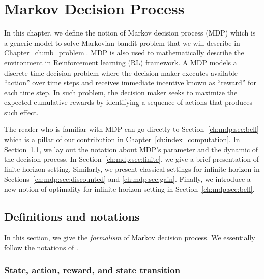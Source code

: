 \begingroup

\let\clearpage\relax

\chapter{Markov Decision Process}
\label{ch:mdp}


In this chapter, we define the notion of Markov decision process (MDP) which is a generic model to solve Markovian bandit problem that we will describe in Chapter~\ref{ch:mb_problem}.
MDP is also used to mathematically describe the environment in Reinforcement learning (RL) framework.
A MDP models a discrete-time decision problem where the decision maker executes available ``action'' over time steps and receives immediate incentive known as ``reward'' for each time step.
In such problem, the decision maker seeks to maximize the expected cumulative rewards by identifying a sequence of actions that produces such effect.

The reader who is familiar with MDP can go directly to Section~\ref{ch:mdp:sec:bell} which is a pillar of our contribution in Chapter~\ref{ch:index_computation}.
In Section~\ref{ch:mdp:sec:defn}, we lay out the notation about MDP's parameter and the dynamic of the decision process.
In Section~\ref{ch:mdp:sec:finite}, we give a brief presentation of finite horizon setting.
Similarly, we present classical settings for infinite horizon in Sections~\ref{ch:mdp:sec:discounted} and \ref{ch:mdp:sec:gain}.
Finally, we introduce a new notion of optimality for infinite horizon setting in Section~\ref{ch:mdp:sec:bell}.


\section{Definitions and notations}
\label{ch:mdp:sec:defn}

In this section, we give the \emph{formalism} of Markov decision process. %
We essentially follow the notations of \cite{puterman2014markov}.

\subsection{State, action, reward, and state transition}


